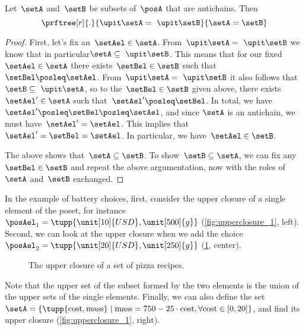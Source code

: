 \begin{lemma}
	\label{lem:up-cl-inj-antichains}
	Let~$\setA$ and~$\setB$ be subsets of~$\posA$ that are antichains.
	Then
	\begin{equation*}
		\prftree[r]{.}{\upit  \setA = \ \upit  \setB}{\setA = \setB}
	\end{equation*}
\end{lemma}

\begin{proof}
	First, let's fix an~$\setAel \in \setA$.
	From~$\upit  \setA = \ \upit  \setB$ we know that in particular$\setA \subseteq \ \upit  \setB$.
	This means that for our fixed~$\setAel \in \setA$ there exists~$\setBel \in \setB$ such that~$\setBel \posleq \setAel$.
	From~$\upit \setA = \ \upit  \setB$ it also follows that~$\setB \subseteq \ \upit  \setA$, so to the~$\setBel \in \setB$ given above, there exists~$\setAel' \in \setA$ such that~$\setAel' \posleq \setBel$.
	In total, we have~$\setAel' \posleq \setBel \posleq \setAel$, and since $\setA$ is an antichain, we must have~$\setAel' = \setAel$.
	This implies that~$\setAel' = \setBel = \setAel$.
	In particular, we have~$\setAel \in \setB$.

	The above shows that~$\setA \subseteq \setB$.
	To show~$\setB \subseteq \setA$, we can fix any~$\setBel \in \setB$ and repeat the above argumentation, now with the roles of~$\setA$ and~$\setB$ exchanged.
\end{proof}

In the example of battery choices, first, consider the upper closure of a single element of the poset, for instance~$\posAel_1=\tupp{\unit[10]{USD},\unit[500]{g}}$ (\cref{fig:upperclosure_1}, left).
Second, we can look at the upper closure when we add the choice~$\posAel_2=\tupp{\unit[20]{USD},\unit[250]{g}}$ (\cref{fig:upperclosure_2}, center).

\begin{figure}[h!]
	\centering
	\caption{The upper closure of a set of pizza recipes.}
	\label{fig:upperclosure_2}
\end{figure}

Note that the upper set of the subset formed by the two elements is the union of the upper sets of the single elements.
Finally, we can also define the set~$\setA=\{\tupp{\text{cost},\text{mass}}\mid \text{mass}=750-25\cdot \text{cost}, \forall \text{cost} \in [0,20]\}$, and find its upper closure (\cref{fig:upperclosure_1}, right).
\begin{figure*}[h!]
	\centering
	\caption{Example of uppler closure for different sets of battery choices. }
	\label{fig:upperclosure_1}
\end{figure*}

